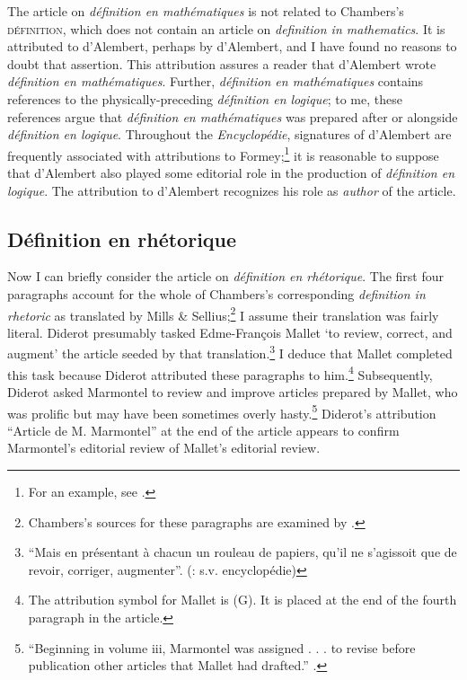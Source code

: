\documentclass[output=paper]{langscibook}
\begin{document}
The article on \emph{définition en mathématiques} is not related to Chambers’s \textsc{définition}, which does not contain an article on \emph{definition in mathematics}. It is attributed to d’Alembert, perhaps by d’Alembert, and I have found no reasons to doubt that assertion. This attribution assures a reader that d’Alembert wrote \emph{définition en mathématiques}. Further, \emph{définition en mathématiques} contains references to the physically-preceding \emph{définition en logique}; to me, these references argue that \emph{définition en mathématiques} was prepared after or alongside \emph{définition en logique}. Throughout the \emph{Encyclopédie}, signatures of d’Alembert are frequently associated with attributions to Formey;\footnote{For an example, see \citet{Coste2009}.}  it is reasonable to suppose that d’Alembert also played some editorial role in the production of \emph{définition en logique}. The attribution to d’Alembert recognizes his role as \emph{author} of the article.

\subsection{Définition en rhétorique}

Now I can briefly consider the article on \emph{définition en rhétorique}. The first four paragraphs account for the whole of Chambers’s corresponding \emph{definition in rhetoric} as translated by Mills \& Sellius;\footnote{Chambers’s sources for these paragraphs are examined by \citet[203-225]{Bocast2016}.}  I assume their translation was fairly literal. Diderot presumably tasked Edme-François Mallet ‘to review, correct, and augment’ the article seeded by that translation.\footnote{“Mais en présentant à chacun un rouleau de papiers, qu’il ne s’agissoit que de revoir, corriger, augmenter”. (\citealt{Diderot1751}: s.v. encyclopédie)}  I deduce that Mallet completed this task because Diderot attributed these paragraphs to him.\footnote{The attribution symbol for Mallet is (G). It is placed at the end of the fourth paragraph in the article.}  Subsequently, Diderot asked Marmontel to review and improve articles prepared by Mallet, who was prolific but may have been sometimes overly hasty.\footnote{“Beginning in volume iii, Marmontel was assigned . . . to revise before publication other articles that Mallet had drafted.” \citep[240]{KafkerKafker1988}.}  Diderot’s attribution “Article de M. Marmontel” at the end of the article appears to confirm Marmontel’s editorial review of Mallet’s editorial review.
\end{document}
